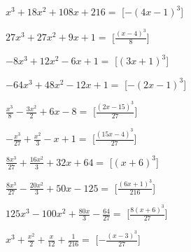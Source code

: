 \begin{esercizio}
\begin{multicols}{2}
\begin{enumeratea}

\item \(x^{3} + 18 x^{2} + 108 x + 216=\) 
\hfill [\(- \left(4 x - 1\right)^{3}\)]
\item \(27 x^{3} + 27 x^{2} + 9 x + 1=\) 
\hfill [\(\frac{\left(x - 4\right)^{3}}{8}\)]
\item \(- 8 x^{3} + 12 x^{2} - 6 x + 1=\) 
\hfill [\(\left(3 x + 1\right)^{3}\)]
\item \(- 64 x^{3} + 48 x^{2} - 12 x + 1=\) 
\hfill [\(- \left(2 x - 1\right)^{3}\)]
\item \(\frac{x^{3}}{8} - \frac{3 x^{2}}{2} + 6 x - 8=\) 
\hfill [\(\frac{\left(2 x - 15\right)^{3}}{27}\)]
\item \(- \frac{x^{3}}{27} + \frac{x^{2}}{3} - x + 1=\) 
\hfill [\(\frac{\left(15 x - 4\right)^{3}}{27}\)]
\item \(\frac{8 x^{3}}{27} + \frac{16 x^{2}}{3} + 32 x + 64=\) 
\hfill [\(\left(x + 6\right)^{3}\)]
\item \(\frac{8 x^{3}}{27} - \frac{20 x^{2}}{3} + 50 x - 125=\) 
\hfill [\(\frac{\left(6 x + 1\right)^{3}}{216}\)]
\item \(125 x^{3} - 100 x^{2} + \frac{80 x}{3} - \frac{64}{27}=\) 
\hfill [\(\frac{8 \left(x + 6\right)^{3}}{27}\)]
\item \(x^{3} + \frac{x^{2}}{2} + \frac{x}{12} + \frac{1}{216}=\) 
\hfill [\(- \frac{\left(x - 3\right)^{3}}{27}\)]

\end{enumeratea}
\end{multicols}
\end{esercizio}
